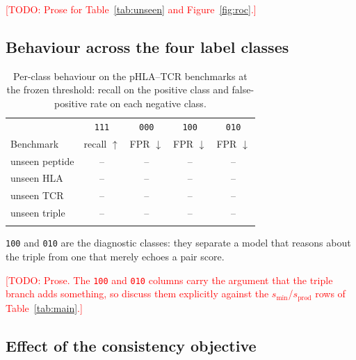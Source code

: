 \documentclass[webpdf,modern,large,namedate]{oup-authoring-template}
\theoremstyle{thmstyleone}
\theoremstyle{thmstyletwo}
\theoremstyle{thmstylethree}
\newcommand{\NA}{--}
\DeclareRobustCommand{\TODO}[1]{\textcolor{red}{[TODO: #1]}}
\newcommand{\PHT}{pHLA--TCR}
\begin{document}
\TODO{Prose for Table~\ref{tab:unseen} and Figure~\ref{fig:roc}.}

\subsection{Behaviour across the four label classes}\label{sec:results:classes}

\begin{table}[!t]
\caption{Per-class behaviour on the \PHT{} benchmarks at the frozen threshold:
recall on the positive class and false-positive rate on each negative class.%
\label{tab:classes}}
\begin{tabular*}{\columnwidth}{@{\extracolsep\fill}lcccc@{\extracolsep\fill}}
\toprule
& \texttt{111} & \texttt{000} & \texttt{100} & \texttt{010}\\
Benchmark & recall $\uparrow$ & FPR $\downarrow$ & FPR $\downarrow$
& FPR $\downarrow$\\
\midrule
unseen peptide & \NA & \NA & \NA & \NA\\
unseen HLA     & \NA & \NA & \NA & \NA\\
unseen TCR     & \NA & \NA & \NA & \NA\\
unseen triple  & \NA & \NA & \NA & \NA\\
\botrule
\end{tabular*}
\begin{tablenotes}%
\item \texttt{100} and \texttt{010} are the diagnostic classes: they separate a
model that reasons about the triple from one that merely echoes a pair score.
\end{tablenotes}
\end{table}

\TODO{Prose. The \texttt{100} and \texttt{010} columns carry the argument that
the triple branch adds something, so discuss them explicitly against the
$s_{\min}$/$s_{\mathrm{prod}}$ rows of Table~\ref{tab:main}.}

\subsection{Effect of the consistency objective}\label{sec:results:consistency}
\end{document}

